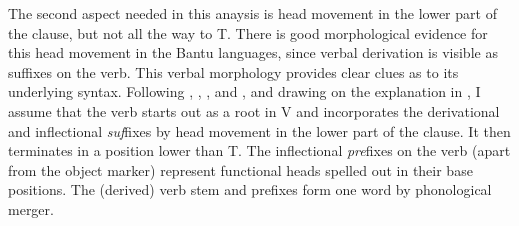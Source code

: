 \documentclass[output=paper
,modfonts
,nonflat]{langsci/langscibook}
\begin{document}
\begin{exe}
	\ex {}
	\xlist
	\endxlist
\end{exe} 
The second aspect needed in this anaysis is head movement in the lower part of the clause, but not all the way to T. There is good morphological evidence for this head movement in the Bantu languages, since verbal derivation is visible as suffixes on the verb. This verbal morphology provides clear clues as to its underlying syntax. Following \citet{Myers1990}, \citet{Julien2002}, \citet{Kinyalolo2003}, and \citet{Buell2005}, and drawing on the explanation in \citet{Van_der_Wal2009}, I assume that the verb starts out as a root in V and incorporates the derivational and inflectional \textit{suf}fixes by head movement in the lower part of the clause. It then terminates in a position lower than T. The inflectional \textit{pre}fixes on the verb (apart from the object marker) represent functional heads spelled out in their base positions. The (derived) verb stem and prefixes form one word by phonological merger.
\end{document}
